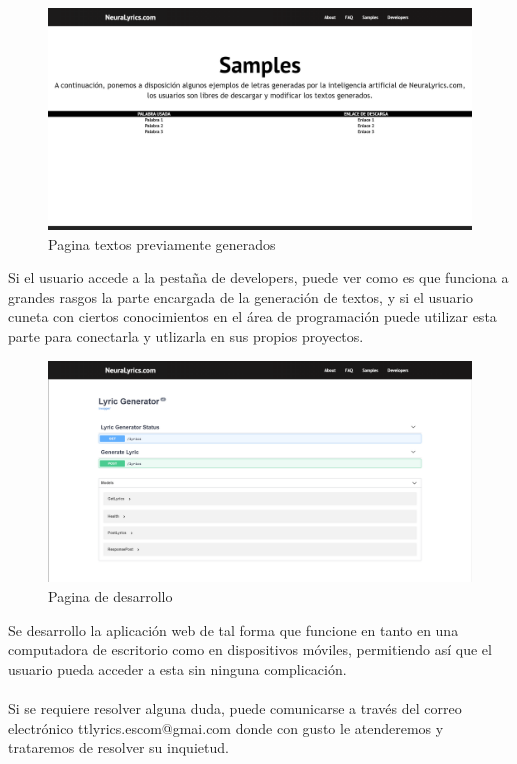 \documentclass[12pt, a4paper, titlepage]{article}
\begin{document}
	\begin{figure}[H] 
		\includegraphics[width=13.5cm]{./Imagenes/Capturas/pejemplos.png}
		\centering \caption{Pagina textos previamente generados}
	\end{figure}
	Si el usuario accede a la pestaña de developers, puede ver como es que funciona a grandes rasgos la parte encargada de la generación de textos, y si el usuario cuneta con ciertos conocimientos en el área de programación puede utilizar esta parte para conectarla y utlizarla en sus propios proyectos.
	\begin{figure}[H] 
		\includegraphics[width=13.5cm]{./Imagenes/Capturas/pdev.png}
		\centering \caption{Pagina de desarrollo}
	\end{figure}
	Se desarrollo la aplicación web de tal forma que funcione en tanto en una computadora de escritorio como en dispositivos móviles, permitiendo así que el usuario pueda acceder a esta sin ninguna complicación.\\\\
	Si se requiere resolver alguna duda, puede comunicarse a través del correo electrónico ttlyrics.escom@gmai.com donde con gusto le atenderemos y trataremos de resolver su inquietud. 
	
	\begin{thebibliography}{20}
	\end{thebibliography}	
\end{document}
